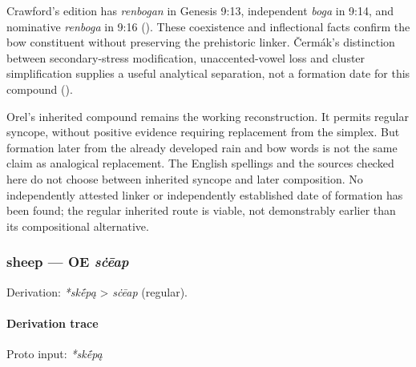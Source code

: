 \documentclass[
  british,
  a4paper,
]{article}
\begin{document}
Crawford's edition has \emph{renbogan} in Genesis 9:13, independent
\emph{boga} in 9:14, and nominative \emph{renboga} in 9:16
(). These coexistence and
inflectional facts confirm the bow constituent without preserving the
prehistoric linker. Čermák's distinction between secondary-stress
modification, unaccented-vowel loss and cluster simplification supplies
a useful analytical separation, not a formation date for this compound
().

Orel's inherited compound remains the working reconstruction. It permits
regular syncope, without positive evidence requiring replacement from
the simplex. But formation later from the already developed rain and bow
words is not the same claim as analogical replacement. The English
spellings and the sources checked here do not choose between inherited
syncope and later composition. No independently attested linker or
independently established date of formation has been found; the regular
inherited route is viable, not demonstrably earlier than its
compositional alternative.

\subsubsection{\texorpdfstring{sheep --- OE
\emph{sċēap}}{sheep --- OE sċēap}}\label{sheep-oe-sux10bux113ap}

Derivation: \emph{*skḗpą} \textgreater{} \emph{sċēap} (regular).

\paragraph{Derivation trace}\label{derivation-trace-66}

Proto input: \emph{*skḗpą}

\begingroup
\setlength{\fboxsep}{6pt}
\end{document}
